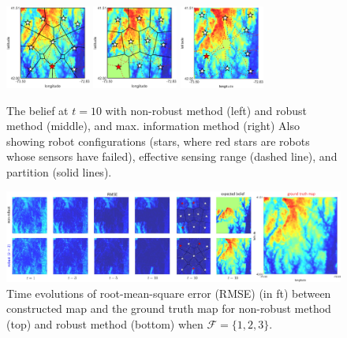 \documentclass[letterpaper, 10 pt, conference]{ieeeconf}
\begin{document}
\begin{figure}
	\centering
	\includegraphics[width=1.1in]{figure/new_fault1}
	\includegraphics[width=1.1in]{figure/new_fault2}
	\includegraphics[width=1.1in]{figure/new_faultn}
	\caption{The belief at $t=10$ with non-robust method (left) and robust method (middle), and max. information method (right) Also showing robot configurations (stars, where red stars are robots whose sensors have failed), effective sensing range (dashed line), and partition (solid lines).
	}
	\label{fig:fig6}
\end{figure}
\begin{figure}
	\centering
	\includegraphics[width=6.2in]{figure/rmse_comparison}
	\caption{Time evolutions of root-mean-square error (RMSE) (in ft) between constructed map and the ground truth map for non-robust method (top) and robust method (bottom) when $\mathcal{F}=\lbrace 1,2,3\rbrace$.} 
	\label{fig:fig3}
\end{figure}
\end{document}
